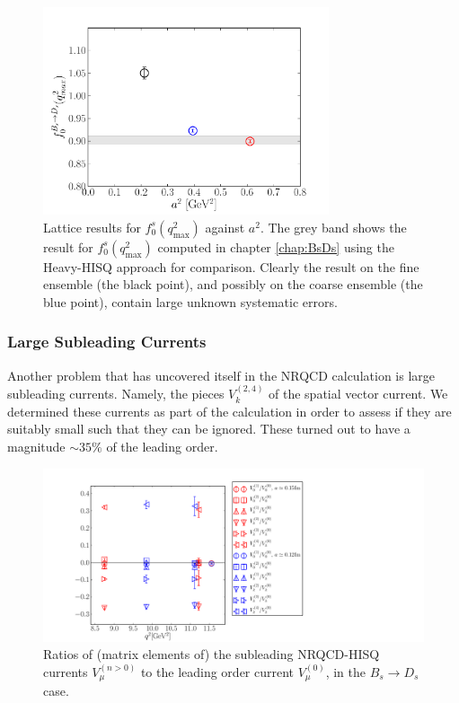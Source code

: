 \begin{figure}[htb!]
  \vspace{-10pt}
  \begin{center}
    \includegraphics[width=0.75\textwidth]{images/nrqcd/BsDs_f0q2max.pdf}
  \end{center}
  \caption{Lattice results for $f_0^s(q^2_{\text{max}})$ against $a^2$. The grey band shows the result for $f_0^s(q^2_{\text{max}})$ computed in chapter \ref{chap:BsDs} using the Heavy-HISQ approach for comparison. Clearly the result on the fine ensemble (the black point), and possibly on the coarse ensemble (the blue point), contain large unknown systematic errors. \label{fig:BsDs_f0q2max}}

\end{figure}

\subsubsection{Large Subleading Currents}
\label{sec:largesubleadingcurrents}

Another problem that has uncovered itself in the NRQCD calculation is large subleading currents. Namely, the pieces $V^{(2,4)}_k$ of the spatial vector current. We determined these currents as part of the calculation in order to assess if they are suitably small such that they can be ignored. These turned out to have a magnitude $\sim 35\%$ of the leading order.

\begin{figure}[htb!]
  \begin{center}
    \includegraphics[width=1.2\textwidth]{images/nrqcd/BsDs_currentratios.pdf}
  \end{center}
  \caption{Ratios of (matrix elements of) the subleading NRQCD-HISQ currents $V_{\mu}^{(n>0)}$ to the leading order current $V_{\mu}^{(0)}$, in the $B_s\to D_s$ case. \label{eq:currentratios}}
\end{figure}

